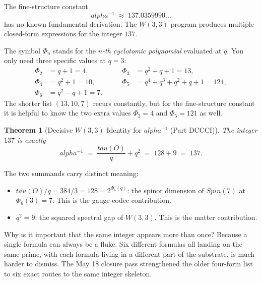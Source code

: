 \documentclass[11pt]{article}
\def\mathrm#1{#1}%
\def\textbf#1{#1}%
\def\alpha{alpha}%
\def\Phi#1{Phi#1}%
\def\tau{tau}%
\newtheorem*{theorem}{Theorem}
\begin{document}
The fine-structure constant
\[
\alpha^{-1} \;\approx\; 137.0359990\ldots
\]
has no known fundamental derivation. The $W(3,3)$ program produces multiple closed-form expressions for the integer $137$.

\begin{mathnote}
The symbol $\Phi_n$ stands for the \emph{$n$-th cyclotomic polynomial} evaluated at $q$. You only need three specific values at $q = 3$:
\[
\begin{aligned}
\Phi_2 &= q+1 = 4, &\qquad \Phi_3 &= q^2 + q + 1 = 13, \\
\Phi_4 &= q^2 + 1 = 10, &\qquad \Phi_5 &= q^4+q^3+q^2+q+1 = 121, \\
\Phi_6 &= q^2 - q + 1 = 7.
\end{aligned}
\]
The shorter list $(13, 10, 7)$ recurs constantly, but for the fine-structure
constant it is helpful to know the two extra values $\Phi_2 = 4$ and
$\Phi_5 = 121$ as well.
\end{mathnote}

\begin{theorem}[Decisive $W(3,3)$ Identity for $\alpha^{-1}$ (Part DCCCI)]
The integer $137$ is exactly
\[
\boxed{\;\alpha^{-1} \;=\; \frac{\tau(O)}{q} + q^2 \;=\; 128 + 9 \;=\; 137.\;}
\]
\end{theorem}

The two summands carry distinct meaning:
\begin{itemize}[leftmargin=2em]
\item $\tau(O)/q = 384/3 = 128 = 2^{\Phi_6(q)}$: the spinor dimension of $\mathrm{Spin}(7)$ at $\Phi_6(3) = 7$. This is the gauge-codec contribution.
\item $q^2 = 9$: the squared spectral gap of $W(3,3)$. This is the matter contribution.
\end{itemize}

Why is it important that the same integer appears more than once? Because a
single formula can always be a fluke.  Six different formulas all landing on
the same prime, with each formula living in a different part of the substrate,
is much harder to dismiss.  The May 18 closure pass strengthened the older
four-form list to \textbf{six exact routes} to the same integer skeleton.
\end{document}
